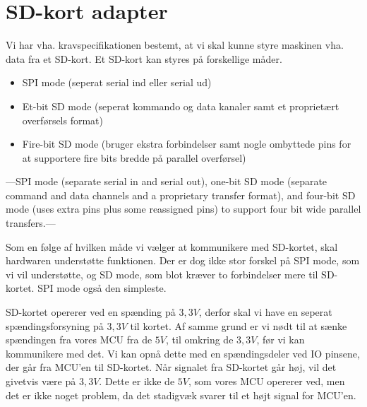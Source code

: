 \section{SD-kort adapter}
Vi har vha. kravspecifikationen bestemt, at vi skal kunne styre
maskinen vha. data fra et SD-kort. Et SD-kort kan styres på
forskellige måder.

\begin{itemize}
\item{SPI mode (seperat serial ind eller serial ud)}
\item{Et-bit SD mode (seperat kommando og data kanaler samt et
    proprietært overførsels format)}
\item{Fire-bit SD mode (bruger ekstra forbindelser samt nogle
    ombyttede pins for at supportere fire bits bredde på parallel
    overførsel)}
\end{itemize}

---SPI mode (separate serial in and serial out), one-bit SD mode
(separate command and data channels and a proprietary transfer
format), and four-bit SD mode (uses extra pins plus some reassigned
pins) to support four bit wide parallel transfers.---



Som en følge af hvilken måde vi vælger at kommunikere med SD-kortet,
skal hardwaren understøtte funktionen. Der er dog ikke stor forskel på 
SPI mode, som vi vil understøtte, og SD mode, som
blot kræver to forbindelser mere til SD-kortet. SPI mode også den simpleste.

SD-kortet opererer ved en spænding på $3,3V$, derfor skal vi have en
seperat spændingsforsyning på $3,3V$ til kortet. Af samme grund er vi
nødt til at sænke spændingen fra vores MCU fra de $5V$, til omkring de
$3,3V$, før vi kan kommunikere med det. Vi kan opnå dette med en
spændingsdeler ved IO pinsene, der går fra MCU'en til SD-kortet. Når
signalet fra SD-kortet går høj, vil det givetvis være på $3,3V$. Dette
er ikke de $5V$, som vores MCU opererer ved, men det er ikke noget
problem, da det stadigvæk svarer til et højt signal for MCU'en.

